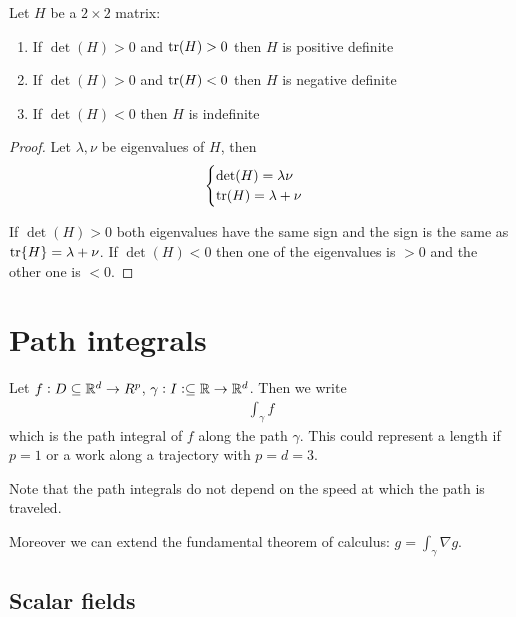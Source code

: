 \documentclass[12pt]{extarticle}
\begin{document}
\begin{lemma}[$d = 2$]
    Let $H$ be a $2 \times 2$ matrix:
    \begin{enumerate}[label=\roman*.]
        \item If $\det(H) > 0$ and $\tr(H) > 0$ then $H$ is positive definite
        \item If $\det(H) > 0$ and $\tr(H) < 0$ then $H$ is negative definite
        \item If $\det(H) < 0$ then $H$ is indefinite
    \end{enumerate}
\end{lemma}

\begin{proof}
    Let $\lambda, \nu$ be eigenvalues of $H$, then
    \begin{equation}
        \begin{cases}
            \det(H) = \lambda \nu \\
            \tr(H) = \lambda + \nu
        \end{cases}
    \end{equation}

    If $\det(H) > 0$ both eigenvalues have the same sign and the sign is the same as $\tr{H} = \lambda + \nu$.
    If $\det(H) < 0$ then one of the eigenvalues is $> 0$ and the other one is $< 0$.
\end{proof}


\section{Path integrals}

Let $f: D \subseteq \mathbb{R}^d \to R^p$, $\gamma: I:\subseteq \mathbb{R} \to \mathbb{R}^d$.
Then we write
\begin{eqnarray}
    \int_\gamma f
\end{eqnarray}
which is the path integral of $f$ along the path $\gamma$.
This could represent a length if $p = 1$ or a work along a trajectory with $p = d = 3$.

Note that the path integrals do not depend on the speed at which the path is traveled.

Moreover we can extend the fundamental theorem of calculus: $g = \int_\gamma \nabla g$.

\subsection{Scalar fields}
\end{document}
